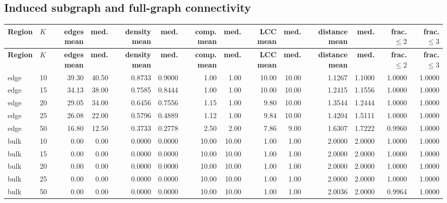 \documentclass[10pt,letterpaper]{article}
\newcommand{\Hdr}[1]{\cellcolor{navy}\color{white}\bfseries #1}
\begin{document}
\subsection{Induced subgraph and full-graph connectivity}
\begin{longtable}{|l|l|r|r|r|r|r|r|r|r|r|r|r|r|}\hline
\Hdr{Region} & \Hdr{$K$} & \Hdr{edges mean} & \Hdr{med.} & \Hdr{density mean} & \Hdr{med.} & \Hdr{comp. mean} & \Hdr{med.} & \Hdr{LCC mean} & \Hdr{med.} & \Hdr{distance mean} & \Hdr{med.} & \Hdr{frac. $\le2$} & \Hdr{frac. $\le3$}\\\hline\endfirsthead
\hline \Hdr{Region} & \Hdr{$K$} & \Hdr{edges mean} & \Hdr{med.} & \Hdr{density mean} & \Hdr{med.} & \Hdr{comp. mean} & \Hdr{med.} & \Hdr{LCC mean} & \Hdr{med.} & \Hdr{distance mean} & \Hdr{med.} & \Hdr{frac. $\le2$} & \Hdr{frac. $\le3$}\\\hline\endhead
edge & 10 & 39.30 & 40.50 & 0.8733 & 0.9000 & 1.00 & 1.00 & 10.00 & 10.00 & 1.1267 & 1.1000 & 1.0000 & 1.0000 \\\hline
edge & 15 & 34.13 & 38.00 & 0.7585 & 0.8444 & 1.00 & 1.00 & 10.00 & 10.00 & 1.2415 & 1.1556 & 1.0000 & 1.0000 \\\hline
edge & 20 & 29.05 & 34.00 & 0.6456 & 0.7556 & 1.15 & 1.00 & 9.80 & 10.00 & 1.3544 & 1.2444 & 1.0000 & 1.0000 \\\hline
edge & 25 & 26.08 & 22.00 & 0.5796 & 0.4889 & 1.12 & 1.00 & 9.84 & 10.00 & 1.4204 & 1.5111 & 1.0000 & 1.0000 \\\hline
edge & 50 & 16.80 & 12.50 & 0.3733 & 0.2778 & 2.50 & 2.00 & 7.86 & 9.00 & 1.6307 & 1.7222 & 0.9960 & 1.0000 \\\hline
\hline
bulk & 10 & 0.00 & 0.00 & 0.0000 & 0.0000 & 10.00 & 10.00 & 1.00 & 1.00 & 2.0000 & 2.0000 & 1.0000 & 1.0000 \\\hline
bulk & 15 & 0.00 & 0.00 & 0.0000 & 0.0000 & 10.00 & 10.00 & 1.00 & 1.00 & 2.0000 & 2.0000 & 1.0000 & 1.0000 \\\hline
bulk & 20 & 0.00 & 0.00 & 0.0000 & 0.0000 & 10.00 & 10.00 & 1.00 & 1.00 & 2.0000 & 2.0000 & 1.0000 & 1.0000 \\\hline
bulk & 25 & 0.00 & 0.00 & 0.0000 & 0.0000 & 10.00 & 10.00 & 1.00 & 1.00 & 2.0000 & 2.0000 & 1.0000 & 1.0000 \\\hline
bulk & 50 & 0.00 & 0.00 & 0.0000 & 0.0000 & 10.00 & 10.00 & 1.00 & 1.00 & 2.0036 & 2.0000 & 0.9964 & 1.0000 \\\hline
\hline
\hline\end{longtable}
\endgroup
\begingroup
\end{document}
